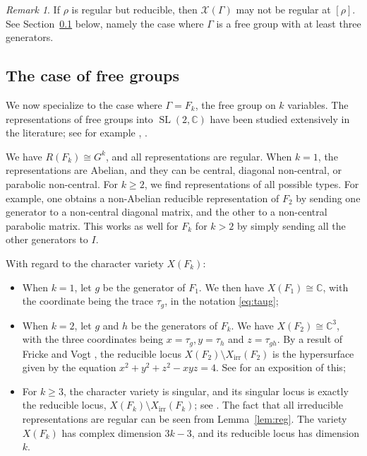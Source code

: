 \documentclass [11pt]{amsart}
\theoremstyle{remark}
\newtheorem {remark}[theorem]{Remark}
\def\cc {{\mathbb{C}}}
\def\C{\cc}
\def\sl {{\operatorname{SL}(2, \cc)}}
\def\Rep {R}
\def\Char {X}
\def\Chars {\mathscr{X} \!}
\def\CharIrr {\Char_{\operatorname{irr}}}
\begin{document}
\begin{remark}
If $\rho$ is regular but reducible, then $\Chars(\Gamma)$ may not be regular at $[\rho]$. See Section~\ref{sec:free} below, namely the case where $\Gamma$ is a free group with at least three generators.
\end{remark}

\subsection{The case of free groups}
\label{sec:free}
We now specialize to the case where $\Gamma =F_k$, the free group on $k$ variables. The representations of free groups into $\sl$ have been studied extensively in the literature; see for example \cite{Horowitz}, \cite{HeusenerPorti}.

We have $\Rep(F_k) \cong G^{k}$, and all representations are regular. When $k=1$, the representations are Abelian, and they can be central, diagonal non-central, or parabolic non-central. For $k \geq 2$, we find representations of all possible types. For example, one obtains a non-Abelian reducible representation of $F_2$ by sending one generator to a non-central diagonal matrix, and the other to a non-central parabolic matrix. This works as well for $F_k$ for $k > 2$ by simply sending all the other generators to $I$.

With regard to the character variety $X(F_k)$:
\begin{itemize}
\item When $k=1$, let $g$ be the generator of $F_1$. We then have $X(F_1) \cong \C$, with the coordinate being the trace $\tau_g$, in the notation \eqref{eq:taug};
\item When $k=2$, let $g$ and $h$ be the generators of $F_k$. We have $X(F_2) \cong \C^3$, with the three coordinates being $x=\tau_g, y=\tau_h$ and $z=\tau_{gh}$. By a result of Fricke \cite{Fricke} and Vogt \cite{Vogt},  the reducible locus $\Char(F_2) \setminus \CharIrr(F_2)$ is the hypersurface given by the equation $x^2 + y^2 + z^2 - xyz=4$. See \cite{GoldmanFV} for an exposition of this; 
\item For $k \geq 3$, the character variety is singular, and its singular locus is exactly the reducible locus, $\Char(F_k) \setminus \CharIrr(F_k)$; see \cite[Section 5.3]{HeusenerPorti}. The fact that all irreducible representations are regular can be seen from Lemma~\ref{lem:reg}. The variety $X(F_k)$ has complex dimension $3k-3$, and its reducible locus has dimension $k$. 
\end{itemize}
\end{document}
